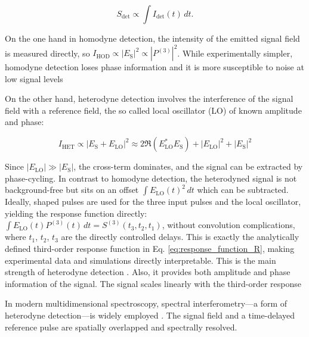 \begin{equation}
	S_{\text{det}} \propto \int I_{\text{det}}(t) \, dt.
	\label{eq:signal_intensity}
\end{equation}

\noindent On the one hand in homodyne detection, the intensity of the emitted signal field is measured directly, so $ I_{\text{HOD}} \propto |E_{\text{S}}|^2 \propto |P^{(3)}|^2 $. While experimentally simpler, homodyne detection loses phase information and it is more susceptible to noise at low signal levels %

\noindent On the other hand, heterodyne detection involves the interference of the signal field with a reference field, the so called local oscillator (LO) of known amplitude and phase:

\begin{equation}
	I_{\text{HET}} \propto |E_{\text{S}} + E_{\text{LO}}|^2 \approx 2\Re{(E_{\text{LO}}^*E_{\text{S}})} + |E_{\text{LO}}|^2 + |E_{\text{S}}|^2
	\label{eq:heterodyne}
\end{equation}

\noindent Since $|E_{\text{LO}}| \gg |E_{\text{S}}|$, the cross-term dominates, and the signal can be extracted by phase-cycling. In contrast to homodyne detection, the heterodyned signal is not background-free but sits on an offset $\int E_{\text{LO}}(t)^2 \, dt$ which can be subtracted. Ideally, shaped pulses are used for the three input pulses and the local oscillator, yielding the response function directly: $\int E_{\text{LO}}(t) P^{(3)}(t) \, dt = S^{(3)}(t_3, t_2, t_1)$, without convolution complications, where $t_1$, $t_2$, $t_3$ are the directly controlled delays. This is exactly the analytically defined third-order response function in Eq. \eqref{eq:response_function_R}, making experimental data and simulations directly interpretable. This is the main strength of heterodyne detection \cite{mukamel1995principlesnonlinearoptical}. Also, it provides both amplitude and phase information of the signal. The signal scales linearly with the third-order response  

\noindent In modern multidimensional spectroscopy, spectral interferometry—a form of heterodyne detection—is widely employed \cite{hybletal1998twodimensionalelectronicspectroscopy}. The signal field and a time-delayed reference pulse are spatially overlapped and spectrally resolved.



